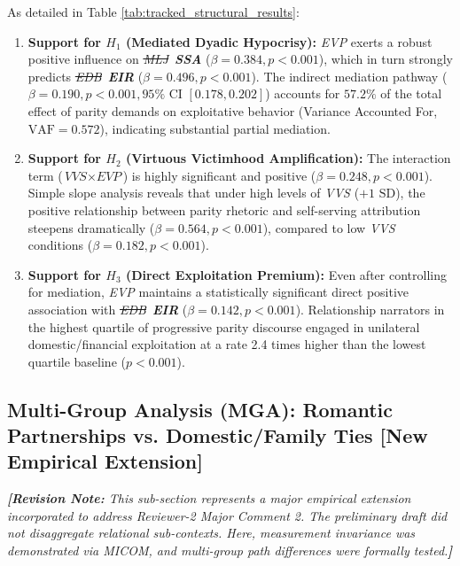 \documentclass[11pt,a4paper]{article}
\newcommand{\textadded}[1]{{\color{blue!80!black}\textbf{#1}}}
\newcommand{\textdeleted}[1]{{\color{red!70!black}\sout{#1}}}
\newcommand{\textnote}[1]{\noindent\textit{\textcolor{teal!80!black}{\textbf{[Revision Note:} #1\textbf{]}}}\\[0.5ex]}
\begin{document}
As detailed in Table \ref{tab:tracked_structural_results}:
\begin{enumerate}[leftmargin=*]
    \item \textbf{Support for $H_1$ (Mediated Dyadic Hypocrisy):} \textit{EVP} exerts a robust positive influence on \textdeleted{\textit{MLJ}}\ \textadded{\textit{SSA}} ($\beta = 0.384, p < 0.001$), which in turn strongly predicts \textdeleted{\textit{EDB}}\ \textadded{\textit{EIR}} ($\beta = 0.496, p < 0.001$). The indirect mediation pathway ($\beta = 0.190, p < 0.001, 95\% \text{ CI } [0.178, 0.202]$) accounts for $57.2\%$ of the total effect of parity demands on exploitative behavior (Variance Accounted For, $\text{VAF} = 0.572$), indicating substantial partial mediation.
    \item \textbf{Support for $H_2$ (Virtuous Victimhood Amplification):} The interaction term ($\textit{VVS} \times \textit{EVP}$) is highly significant and positive ($\beta = 0.248, p < 0.001$). Simple slope analysis reveals that under high levels of \textit{VVS} ($+1 \text{ SD}$), the positive relationship between parity rhetoric and self-serving attribution steepens dramatically ($\beta = 0.564, p < 0.001$), compared to low \textit{VVS} conditions ($\beta = 0.182, p < 0.001$).
    \item \textbf{Support for $H_3$ (Direct Exploitation Premium):} Even after controlling for mediation, \textit{EVP} maintains a statistically significant direct positive association with \textdeleted{\textit{EDB}}\ \textadded{\textit{EIR}} ($\beta = 0.142, p < 0.001$). Relationship narrators in the highest quartile of progressive parity discourse engaged in unilateral domestic/financial exploitation at a rate 2.4 times higher than the lowest quartile baseline ($p < 0.001$).
\end{enumerate}

\subsection[Multi-Group Analysis (MGA): Romantic Partnerships vs. Domestic/Family Ties]{Multi-Group Analysis (MGA): Romantic Partnerships vs. Domestic/Family Ties \textadded{[New Empirical Extension]}}
\label{sec:tracked_mga}

\textnote{This sub-section represents a major empirical extension incorporated to address Reviewer-2 Major Comment 2. The preliminary draft did not disaggregate relational sub-contexts. Here, measurement invariance was demonstrated via MICOM, and multi-group path differences were formally tested.}
\end{document}

